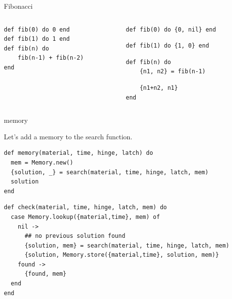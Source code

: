 \begin{frame}[fragile]{Fibonacci}

\begin{columns}
 \begin{column}{0.5\linewidth}
\begin{verbatim}
def fib(0) do 0 end
def fib(1) do 1 end
def fib(n) do
    fib(n-1) + fib(n-2)
end
\end{verbatim}
 \end {column}
\pause
 \begin{column}{0.5\linewidth}
\begin{verbatim}
def fib(0) do {0, nil} end
\end{verbatim}
\pause
\begin{verbatim}
def fib(1) do {1, 0} end
\end{verbatim}
\pause
\begin{verbatim}
def fib(n) do
    {n1, n2} = fib(n-1) 
\end{verbatim}
\pause
\begin{verbatim}
    {n1+n2, n1}
end
\end{verbatim}
 \end {column}
\end{columns}

\end{frame}

\begin{frame}[fragile]{memory}

Let's add a memory to the search function. 

\begin{verbatim}
def memory(material, time, hinge, latch) do
  mem = Memory.new()
  {solution, _} = search(material, time, hinge, latch, mem)
  solution
end
\end{verbatim}\pause

\begin{verbatim}
def check(material, time, hinge, latch, mem) do
  case Memory.lookup({material,time}, mem) of
    nil ->
      ## no previous solution found
      {solution, mem} = search(material, time, hinge, latch, mem)
      {solution, Memory.store({material,time}, solution, mem)}
    found -> 
      {found, mem}
  end
end
\end{verbatim}

\end{frame}


